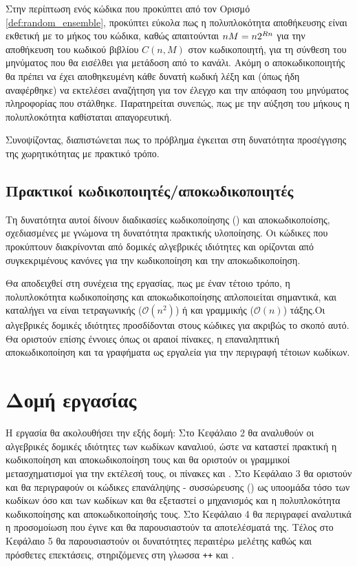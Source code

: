 Στην περίπτωση ενός κώδικα που προκύπτει από τον Ορισμό \ref{def:random_ensemble}, προκύπτει εύκολα πως η πολυπλοκότητα αποθήκευσης είναι εκθετική με το μήκος του κώδικα, καθώς απαιτούνται $nM = n\*2^{Rn}$  για την αποθήκευση του κωδικού βιβλίου $C(n,M)$ στον κωδικοποιητή, για τη σύνθεση του μηνύματος που θα εισέλθει για μετάδοση από το κανάλι. Ακόμη ο αποκωδικοποιητής θα πρέπει να έχει αποθηκευμένη κάθε δυνατή κωδική λέξη και (όπως ήδη αναφέρθηκε) να εκτελέσει αναζήτηση για τον έλεγχο και την απόφαση του μηνύματος πληροφορίας που στάλθηκε. Παρατηρείται συνεπώς, πως με την αύξηση του μήκους  η πολυπλοκότητα καθίσταται απαγορευτική.

Συνοψίζοντας, διαπιστώνεται πως το πρόβλημα έγκειται στη δυνατότητα προσέγγισης της χωρητικότητας με πρακτικό τρόπο.

\subsection{Πρακτικοί κωδικοποιητές/αποκωδικοποιητές}
Τη δυνατότητα αυτοί δίνουν διαδικασίες κωδικοποίησης () και αποκωδικοποίσης, σχεδιασμένες με γνώμονα τη δυνατότητα πρακτικής υλοποίησης. Οι κώδικες που προκύπτουν διακρίνονται από δομικές αλγεβρικές ιδιότητες και ορίζονται από συγκεκριμένους κανόνες για την κωδικοποίηση και την αποκωδικοποίηση.

Θα αποδειχθεί στη συνέχεια της εργασίας, πως με έναν τέτοιο τρόπο, η πολυπλοκότητα κωδικοποίησης και αποκωδικοποίησης απλοποιείται σημαντικά, και καταλήγει να είναι τετραγωνικής ($\mathcal{O}(n^2)$) ή και γραμμικής ($\mathcal{O}(n)$) τάξης.Οι αλγεβρικές δομικές ιδιότητες προσδίδονται στους κώδικες για ακριβώς το σκοπό αυτό. Θα οριστούν επίσης έννοιες όπως οι αραιοί πίνακες, η επαναληπτική αποκωδικοποίηση και τα γραφήματα  ως εργαλεία για την περιγραφή τέτοιων κωδίκων.

\section{Δομή εργασίας}
Η εργασία θα ακολουθήσει την εξής δομή: Στο Κεφάλαιο 2 θα αναλυθούν οι αλγεβρικές δομικές ιδιότητες των κωδίκων καναλιού, ώστε να καταστεί πρακτική η κωδικοποίηση και αποκωδικοποίηση τους και θα οριστούν οι γραμμικοί μετασχηματισμοί για την εκτέλεσή τους, οι πίνακες \textbf{} και \textbf{}. Στο Κεφάλαιο 3 θα οριστούν και θα περιγραφούν οι κώδικες επανάληψης - συσσώρευσης () ως υποομάδα τόσο των κωδίκων  όσο και των  κωδίκων και θα εξεταστεί ο μηχανισμός και η πολυπλοκότητα κωδικοποίησης και αποκωδικοποίησής τους. Στο Κεφάλαιο 4 θα περιγραφεί αναλυτικά η προσομοίωση που έγινε και θα παρουσιαστούν τα αποτελέσματά της. Τέλος στο Κεφάλαιο 5 θα παρουσιαστούν οι δυνατότητες περαιτέρω μελέτης καθώς και πρόσθετες επεκτάσεις, στηριζόμενες στη γλωσσα \texttt{++} και .
